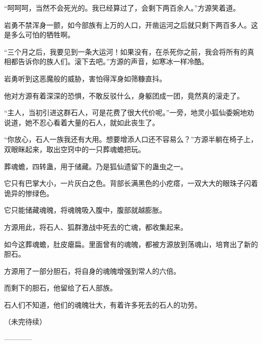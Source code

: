 \begin{this_body}
“呵呵呵，当然不会死光的。我已经算过了，会剩下两百余人。”方源笑着道。

岩勇不禁浑身一颤，如今部族有上万的人口，开凿运河之后就只剩下两百多人。这是多么可怕的牺牲啊。

“三个月之后，我要见到一条大运河！如果没有，在杀死你之前，我会将所有的真相都告诉你的族人们。滚下去吧。”方源的声音，如寒冰一样冷酷。

岩勇听到这恶魔般的威胁，害怕得浑身如筛糠直抖。

他对方源有着深深的恐惧，不敢反驳什么，身躯团成一团，竟然真的滚走了。

“主人，当初引进这群石人，可是花费了很大代价呢。”一旁，地灵小狐仙委婉地劝说道，她不忍心看着大量的石人，就如此丧生了。

“你放心，石人一族我还有大用。想要增添人口还不容易么？”方源半躺在椅子上，双眼眯起来，取出空窍中的一只葬魂蟾把玩。

葬魂蟾，四转蛊，用于储藏。乃是狐仙遗留下的蛊虫之一。

它只有巴掌大小，一片灰白之色。背部长满黑色的小疙瘩，一双大大的眼珠子闪着诡异的惨绿色。

它只能储藏魂魄，将魂魄吸入腹中，腹部就越膨胀。

方源用此，将石人、狐群激战中死去的亡魂，都收集起来。

如今这葬魂蟾，肚皮瘪扁。里面曾有的魂魄，都被方源放到荡魂山，培育出了新的胆石。

方源用了一部分胆石，将自身的魂魄增强到常人的六倍。

而剩下的胆石，他留给了石人部族。

石人们不知道，他们的魂魄壮大，有着许多死去的石人的功劳。

（未完待续）

------------

\end{this_body}

